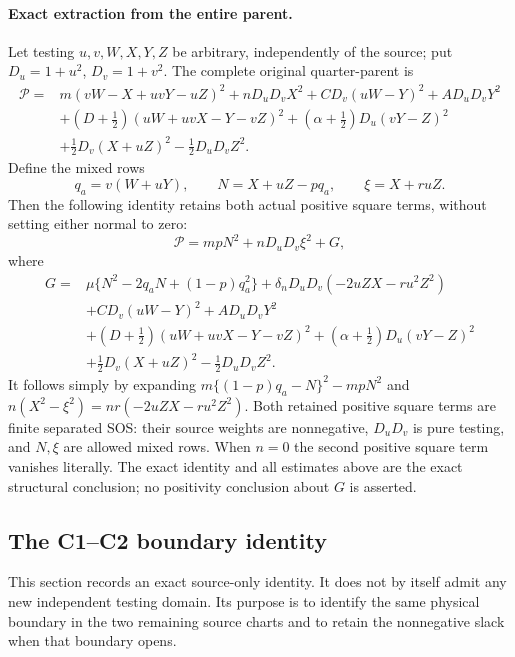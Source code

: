 \paragraph{Exact extraction from the entire parent.}
Let testing $u,v,W,X,Y,Z$ be arbitrary, independently of the source;
put $D_u=1+u^2$, $D_v=1+v^2$.  The complete original quarter-parent is
\begin{align*}
 \mathcal P={}&m(vW-X+uvY-uZ)^2+nD_uD_vX^2
     +CD_v(uW-Y)^2+AD_uD_vY^2\\
 &+(D+\tfrac12)(uW+uvX-Y-vZ)^2
     +(\alpha+\tfrac12)D_u(vY-Z)^2\\
 &+\tfrac12D_v(X+uZ)^2-\tfrac12D_uD_vZ^2.
\end{align*}
Define the mixed rows
\[
 q_a=v(W+uY),\qquad N=X+uZ-pq_a,\qquad \xi=X+ruZ.
\]
Then the following identity retains both actual positive square terms,
without setting either normal to zero:
\[
 \mathcal P=mpN^2+nD_uD_v\xi^2+G,                       \tag{RER8}
\]
where
\begin{align*}
 G={}&\mu\{N^2-2q_aN+(1-p)q_a^2\}
        +\delta_nD_uD_v(-2uZX-ru^2Z^2)\\
 &+CD_v(uW-Y)^2+AD_uD_vY^2\\
 &+(D+\tfrac12)(uW+uvX-Y-vZ)^2
        +(\alpha+\tfrac12)D_u(vY-Z)^2\\
 &+\tfrac12D_v(X+uZ)^2-\tfrac12D_uD_vZ^2.
\end{align*}
It follows simply by expanding
$m\{(1-p)q_a-N\}^2-mpN^2$ and
$n(X^2-\xi^2)=nr(-2uZX-ru^2Z^2)$.
Both retained positive square terms are finite separated SOS: their source weights
are nonnegative, $D_uD_v$ is pure testing, and $N,\xi$ are allowed
mixed rows.  When $n=0$ the second positive square term vanishes literally.
The exact identity and all estimates above are the exact
structural conclusion; no positivity conclusion about $G$ is asserted.

\subsection{The C1--C2 boundary identity}
\label{component:pc024f5300388}

\label{pc024f5300388:sec:r13-source-overlap}

This section records an exact source-only identity. It does not by itself
admit any new independent testing domain. Its purpose is to identify the
same physical boundary in the two remaining source charts and to retain
the nonnegative slack when that boundary opens.

